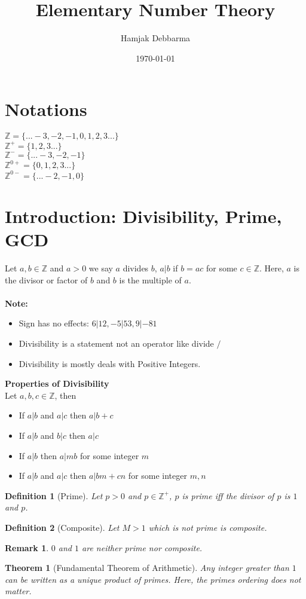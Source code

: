\documentclass[12pt,a4paper]{article}
\title{Elementary Number Theory \vspace{0.5em}}
\author{Hamjak Debbarma}
\date{\today}
\newcommand{\Z}{\mathbb{Z}}
\newtheorem{thm}{Theorem}
\newtheorem{defn}{Definition}
\newtheorem{rem}{Remark}
\begin{document}
  \maketitle
  \section*{Notations}
  $\Z = \{... -3,-2,-1,0,1,2,3...\}$ \\
  $\Z^{+} = \{1,2,3...\}$ \\
  $\Z^{-} = \{... -3,-2,-1\}$ \\
  $\Z^{0+} = \{0,1,2,3...\}$ \\
  $\Z^{0-} = \{...-2,-1,0\}$
  \section{Introduction: Divisibility, Prime, GCD}
  Let $a,b \in \Z$ and $a>0$ we say $a$ divides $b$, $a|b$ if $b=ac$ for some $c\in \Z$. Here, $a$ is the divisor or factor of $b$ and $b$ is the multiple of $a$.
  \\ \\
 \textbf{Note: }
  \begin{itemize}
  	\item Sign has no effects: $6|12, -5|53, 9|-81$
  	\item Divisibility is a statement not an operator like divide $/$
  	\item Divisibility is mostly deals with Positive Integers.
  \end{itemize}
\textbf{Properties of Divisibility}\\
Let $a,b,c \in \Z$, then
\begin{itemize}
	\item If $a|b$ and $a|c$ then $a|b+c$
	\item If $a|b$ and $b|c$ then $a|c$
	\item If $a|b$ then $a|mb$ for some integer $m$
	\item If $a|b$ and $a|c$ then $a|bm+cn$ for some integer $m,n$ 
\end{itemize}

\begin{defn}[Prime]
	Let $p>0$ and $p\in \Z^{+}$, $p$ is prime iff the divisor of $p$ is $1$ and $p$.
\end{defn}

\begin{defn}[Composite]
	Let $M>1$ which is not prime is composite.
\end{defn}
\begin{rem}
	$0$ and $1$ are neither prime nor composite.
\end{rem}
\begin{thm}[Fundamental Theorem of Arithmetic]
	Any integer greater than $1$ can be written as a unique product of primes. Here, the primes ordering does not matter.
\end{thm}
\end{document}
